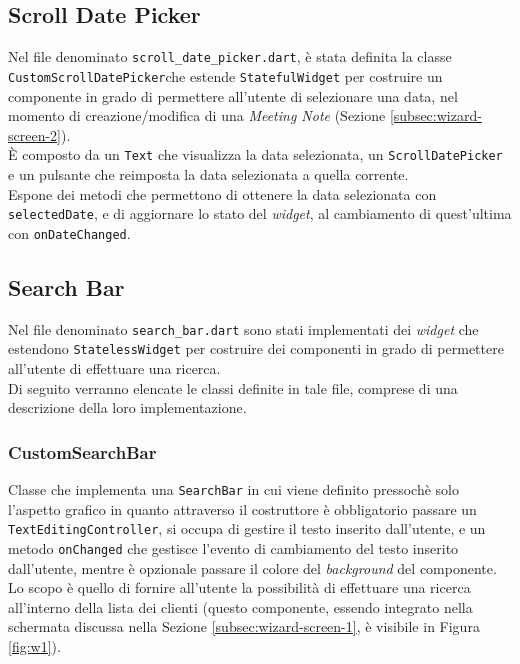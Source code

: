 \subsection{Scroll Date Picker}
\label{subsec:scroll-date-picker}

Nel file denominato \lstinline{scroll_date_picker.dart}, è stata definita la classe \lstinline{CustomScrollDatePicker}che estende \lstinline{StatefulWidget} per costruire un componente in grado di permettere all'utente di selezionare una data, nel momento di creazione/modifica di una \emph{Meeting Note} (Sezione \ref{subsec:wizard-screen-2}).\\
È composto da un \lstinline{Text} \cite{site:text} che visualizza la data selezionata, un \lstinline{ScrollDatePicker} \cite{site:scroll-date-picker} e un pulsante che reimposta la data selezionata a quella corrente.\\
Espone dei metodi che permettono di ottenere la data selezionata con \lstinline{selectedDate}, e di aggiornare lo stato del \emph{widget}, al cambiamento di quest'ultima con \lstinline{onDateChanged}.

\subsection{Search Bar}
\label{subsec:search-bar}

Nel file denominato \lstinline{search_bar.dart} sono stati implementati dei \emph{widget} che estendono \lstinline{StatelessWidget} per costruire dei componenti in grado di permettere all'utente di effettuare una ricerca.\\
Di seguito verranno elencate le classi definite in tale file, comprese di una descrizione della loro implementazione.

\subsubsection*{CustomSearchBar}
\label{subsubsec:custom-search-bar}

Classe che implementa una \lstinline{SearchBar} \cite{site:search-bar} in cui viene definito pressochè solo l'aspetto grafico in quanto attraverso il costruttore è obbligatorio passare un \lstinline{TextEditingController}\cite{site:text-editing-controller}, si occupa di gestire il testo inserito dall'utente, e un metodo \lstinline{onChanged} che gestisce l'evento di cambiamento del testo inserito dall'utente, mentre è opzionale passare il colore del \emph{background} del componente. \\
Lo scopo è quello di fornire all'utente la possibilità di effettuare una ricerca all'interno della lista dei clienti (questo componente, essendo integrato nella schermata discussa nella Sezione \ref{subsec:wizard-screen-1}, è visibile in Figura \ref{fig:w1}).


